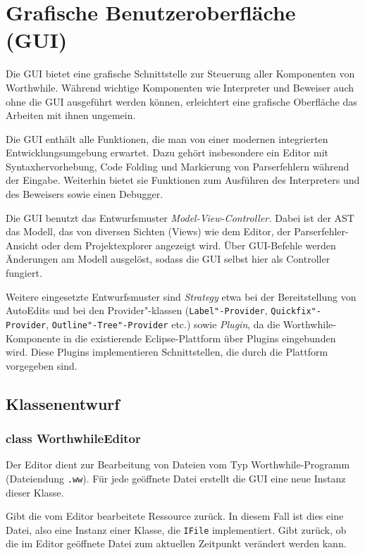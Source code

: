 \section{Grafische Benutzeroberfläche (GUI)}

Die GUI bietet eine grafische Schnittstelle zur Steuerung aller Komponenten von Worthwhile. Während wichtige Komponenten wie Interpreter und Beweiser auch ohne die GUI ausgeführt werden können, erleichtert eine grafische Oberfläche das Arbeiten mit ihnen ungemein.

Die GUI enthält alle Funktionen, die man von einer modernen integrierten Entwicklungsumgebung erwartet. Dazu gehört insbesondere ein Editor mit Syntaxhervorhebung, Code Folding und Markierung von Parserfehlern während der Eingabe. Weiterhin bietet sie Funktionen zum Ausführen des Interpreters und des Beweisers sowie einen Debugger.

Die GUI benutzt das Entwurfsmuster \textit{Model-View-Controller.} Dabei ist der AST das Modell, das von diversen Sichten (Views) wie dem Editor, der Parserfehler-Ansicht oder dem Projektexplorer angezeigt wird. Über GUI-Befehle werden Änderungen am Modell ausgelöst, sodass die GUI selbst hier als Controller fungiert.

Weitere eingesetzte Entwurfsmuster sind \textit{Strategy} etwa bei der Bereitstellung von AutoEdits und bei den Provider"-klassen (\texttt{Label"-Provider}, \texttt{Quickfix"-Provider}, \texttt{Outline"-Tree"-Provider} etc.) sowie \textit{Plugin}, da die Worthwhile-Komponente in die existierende Eclipse-Plattform über Plugins eingebunden wird. Diese Plugins implementieren Schnittstellen, die durch die Plattform vorgegeben sind.

\subsection{Klassenentwurf}

\subsubsection{class WorthwhileEditor}

Der Editor dient zur Bearbeitung von Dateien vom Typ Worthwhile-Programm (Dateiendung \texttt{.ww}). Für jede geöffnete Datei erstellt die GUI eine neue Instanz dieser Klasse.

\begin{description}
	 Gibt die vom Editor bearbeitete Ressource zurück. In diesem Fall ist dies eine Datei, also eine Instanz einer Klasse, die \texttt{IFile} implementiert.
	 Gibt zurück, ob die im Editor geöffnete Datei zum aktuellen Zeitpunkt verändert werden kann.
\end{description}

